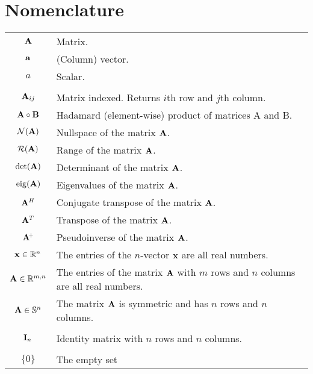 \chapter{Nomenclature}

\begin{tabular}{cl}
$\mathbf{A}$                   & Matrix.                                                   \\
$\mathbf{a}$                   & (Column) vector.                                          \\
$a$                     & Scalar.                                                   \\
& \\
$\mathbf{A}_{ij}$              & Matrix indexed. Returns $i$th row and $j$th column.       \\
$\mathbf{A}\circ \mathbf{B}$          & Hadamard (element-wise) product of matrices A and B.      \\
$\mathcal{N}(\mathbf{A})$              & Nullspace of the matrix $\mathbf{A}$.                            \\
$\mathcal{R}(\mathbf{A})$           & Range of the matrix $\mathbf{A}$.                                \\
$\det(\mathbf{A})$             & Determinant of the matrix $\mathbf{A}$.                          \\
$\operatorname{eig}(\mathbf{A})$             & Eigenvalues of the matrix $\mathbf{A}$.                          \\
$\mathbf{A}^H$                 & Conjugate transpose of the matrix $\mathbf{A}$.                  \\
$\mathbf{A}^T$                 & Transpose of the matrix $\mathbf{A}$.                            \\
$\mathbf{A}\!^+$              & Pseudoinverse of the matrix $\mathbf{A}$.                        \\
$\mathbf{x}\in\mathbb{R}^{n}$            & The entries of the $n$-vector $\mathbf{x}$ are all real numbers. \\
$\mathbf{A}\in\mathbb{R}^{m,n}$           & The entries of the matrix $\mathbf{A}$ with $m$ rows and $n$ columns are all real numbers. \\
$\mathbf{A}\in\mathbb{S}^{n}$            & The matrix $\mathbf{A}$ is symmetric and has $n$ rows and $n$ columns. \\
& \\
$\mathbf{I}_n$                 & Identity matrix with $n$ rows and $n$ columns.            \\
& \\
$\{0\}$                 & The empty set
\end{tabular}